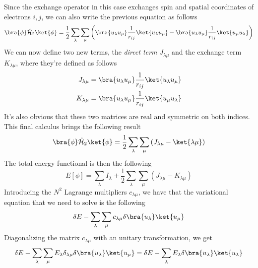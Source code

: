 \documentclass[a4paper, 11pt]{book}
\newcommand{\1}{\opr{\mathds{1}}}
\newcommand{\ham}{\mathcal{H}}
\newcommand{\opr}[1]{\hat{#1}}
\newcommand{\kd}[1]{\delta_{#1}}
\theoremstyle{plain}
\begin{document}
	Since the exchange operator in this case exchanges spin and spatial coordinates of electrons $i,j$, we can also write the previous equation as follows
	\begin{equation}
		\bra{\phi}\opr{\ham}_2\ket{\phi}=\frac{1}{2}\sum_{\lambda}\sum_{\mu}\left( \bra{u_\lambda u_\mu}\frac{1}{r_{ij}}\ket{u_\lambda u_\mu}-\bra{u_\lambda u_\mu}\frac{1}{r_{ij}}\ket{u_\mu u_\lambda} \right)
		\label{eq:eqecxchangeintegralhftheory}
	\end{equation}
	We can now define two new terms, the \textit{direct term} $J_{\lambda \mu}$ and the exchange term $K_{\lambda \mu}$, where they're defined as follows
	\begin{equation}
		\begin{aligned}
			J_{\lambda \mu}&=\bra{u_\lambda u_\mu}\frac{1}{r_{ij}}\ket{u_\lambda u_\mu}\\
			K_{\lambda \mu}&=\bra{u_\lambda u_\mu}\frac{1}{r_{ij}}\ket{u_\mu u_\lambda}
		\end{aligned}
		\label{eq:exchangedirectoperatormatrices}
	\end{equation}
	It's also obvious that these two matrices are real and symmetric on both indices.\\
	This final calculus brings the following result
	\begin{equation}
		\bra{\phi}\opr{\ham}_2\ket{\phi}=\frac{1}{2}\sum_{\lambda}\sum_{\mu}\left( J_{\lambda \mu}-\ket{\lambda \mu} \right)
		\label{eq:hfintegralsham2}
	\end{equation}
	The total energy functional is then the following
	\begin{equation}
		E[\phi]=\sum_{\lambda}I_\lambda+\frac{1}{2}\sum_{\lambda}\sum_{\mu}\left( J_{\lambda \mu}-K_{\lambda \mu} \right)
		\label{eq:energyfunctionalhftheory}
	\end{equation}
	Introducing the $N^2$ Lagrange multipliers $c_{\lambda\mu}$, we have that the variational equation that we need to solve is the following
	\begin{equation}
		\delta E-\sum_{\lambda}\sum_{\mu}c_{\lambda\mu}\delta\bra{u_\lambda}\ket{u_\mu}
		\label{eq:hfvariationalenergy}
	\end{equation}
	Diagonalizing the matrix $c_{\lambda\mu}$ with an unitary transformation, we get
	\begin{equation}
		\delta E-\sum_{\lambda}\sum_{\mu}E_{\lambda}\kd{\lambda\mu}\delta\bra{u_\lambda}\ket{u_\mu}=\delta E-\sum_{\lambda}E_{\lambda}\delta\bra{u_{\lambda}}\ket{u_{\lambda}}
		\label{eq:diagonalizedlagrangematrix}
	\end{equation}
\end{document}
